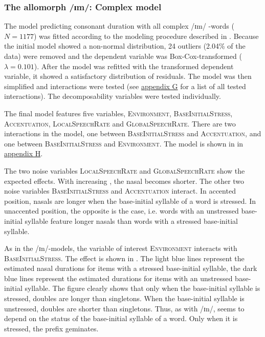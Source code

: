 \subsubsection{The allomorph /ɪm/: Complex model}


The model predicting consonant duration with all complex /ɪm/ -words ($N=1177$) was fitted according to the modeling procedure described in .
Because the initial model showed a non-normal distribution,  24 outliers (2.04\% of the data) were removed and the dependent variable was Box-Cox-transformed ($\lambda = 0.101$).  
After the model was refitted with the transformed dependent variable, it showed a satisfactory distribution of residuals. The model was then simplified and interactions were tested (see \hyperref[Appendix G Summaries of tested interactions in experimental study]{appendix G} for a list of all tested interactions). 
The decomposability variables were tested individually.



The final model features five variables, \textsc{Environment}, \textsc{BaseInitialStress}, \textsc{Accentuation}, \textsc{LocalSpeechRate} and \textsc{GlobalSpeechRate}. There are two interactions in the model, one between \textsc{BaseInitialStress} and \textsc{Accentuation}, and one between \textsc{BaseInitialStress} and \textsc{Environment}. The model is shown in  in \hyperref[Appendix H: Model Summaries Experiment]{appendix H}.

The two noise variables \textsc{LocalSpeechRate} and \textsc{GlobalSpeechRate} show the expected effects. With increasing , the nasal becomes shorter.
 The other two noise variables \textsc{BaseInitialStress} and \textsc{Accentuation} interact. In accented position, nasals are longer when the base-initial syllable of a word is stressed. In unaccented position, the opposite is the case, i.e. words with an unstressed base-initial syllable feature longer nasals than words with a stressed base-initial syllable. 
 


As in the /ɪn/-models, the variable of interest \textsc{Environment} interacts with \textsc{BaseInitialStress}. The effect is shown in . 
The light blue lines represent the estimated nasal durations for items with a stressed base-initial syllable, the dark blue lines represent  the estimated durations for items with an unstressed base-initial syllable.
The figure clearly shows that 
 only when the base-initial syllable is stressed, doubles are  longer than singletons. When the base-initial syllable is unstressed, doubles are shorter than singletons. 
Thus, as with /ɪn/,  seems to depend on the  status of the base-initial syllable of a word. Only when it is stressed, the prefix  geminates.

